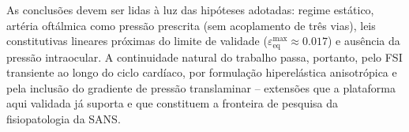 As conclusões devem ser lidas à luz das hipóteses adotadas: regime estático, artéria oftálmica como pressão prescrita (sem acoplamento de três vias), leis constitutivas lineares próximas do limite de validade ($\varepsilon_{\mathrm{eq}}^{\max} \approx 0.017$) e ausência da pressão intraocular. A continuidade natural do trabalho passa, portanto, pelo FSI transiente ao longo do ciclo cardíaco, por formulação hiperelástica anisotrópica \citep{Holzapfel2000} e pela inclusão do gradiente de pressão translaminar -- extensões que a plataforma aqui validada já suporta e que constituem a fronteira de pesquisa da fisiopatologia da SANS.
